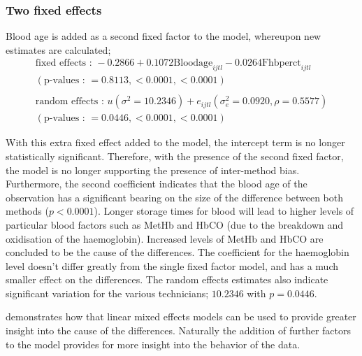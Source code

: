 \documentclass[12pt, a4paper]{report}
\begin{document}
\subsubsection{Two fixed effects}
Blood age is added as a second fixed factor to the model,
whereupon new estimates are calculated;
\begin{eqnarray}
\mbox{fixed effects :   } -0.2866 + 0.1072 \mbox{Bloodage}_{ijtl}
- 0.0264\mbox{Fhbperct}_{ijtl}\nonumber\\
( \mbox{p-values :   } = 0.8113, <0.0001, <0.0001)\nonumber\\\nonumber\\
\mbox{random effects :   } u(\sigma^{2}=10.2346) + e_{ijtl}
(\sigma^{2}_{e}=0.0920, \rho= 0.5577) \nonumber\\
(\mbox{p-values :   } = 0.0446, <0.0001, <0.0001)
\end{eqnarray}


With this extra fixed effect added to the model, the intercept
term is no longer statistically significant. Therefore, with the
presence of the second fixed factor, the model is no longer
supporting the presence of inter-method bias. Furthermore, the
second coefficient indicates that the blood age of the observation
has a significant bearing on the size of the difference between
both methods ($p <0.0001$). Longer storage times for blood will
lead to higher levels of particular blood factors such as MetHb
and HbCO (due to the breakdown and oxidisation of the
haemoglobin). Increased levels of MetHb and HbCO are concluded to
be the cause of the differences. The coefficient for the
haemoglobin level doesn't differ greatly from the single fixed
factor model, and has a much smaller effect on the differences.
The random effects estimates also indicate significant variation
for the various technicians; $10.2346$ with $p=0.0446$.

\citet{LaiShiao} demonstrates how that linear mixed effects models
can be used to provide greater insight into the cause of the
differences. Naturally the addition of further factors to the
model provides for more insight into the behavior of the data.
\end{document}
